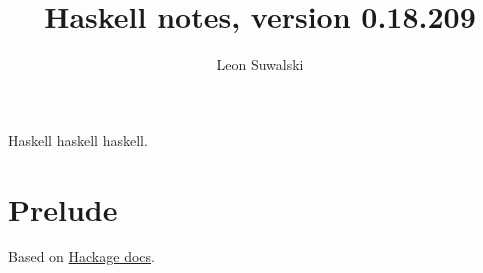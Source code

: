 \documentclass{charun}
\title{Haskell notes, version 0.18.209}
\author{Leon Suwalski}
\begin{document}
\begin{multicols*}{2}
\maketitle
\raggedright
Haskell haskell haskell.
\section{Prelude}
Based on \href{https://hackage.haskell.org/package/base-4.18.0.18.docs/Prelude.html}{Hackage docs}.









\end{multicols*}
\end{document}
